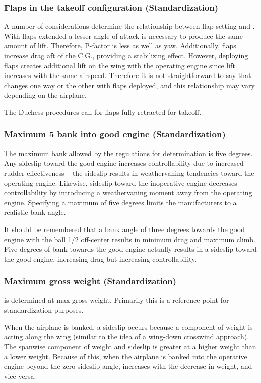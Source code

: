 \subsubsection{Flaps in the takeoff configuration (Standardization)}

A number of considerations determine the relationship between flap setting and \vmc. With flaps extended a lesser
angle of attack is necessary to produce the same amount of lift. Therefore, P-factor is less as well as yaw.
Additionally, flaps increase drag aft of the C.G., providing a stabilizing effect. However, deploying flaps creates
additional lift on the wing with the operating engine since lift increases with the same airspeed. Therefore it is not
straightforward to say that \vmc changes one way or the other with flaps deployed, and this relationship may vary
depending on the airplane.

The Duchess procedures call for flaps fully retracted for takeoff.

\subsubsection{Maximum 5\degree{} bank into good engine (Standardization)}

The maximum bank allowed by the regulations for \vmc determination is five degrees. Any sideslip toward the good
engine increases controllability due to increased rudder effectiveness – the sideslip results in weathervaning
tendencies toward the operating engine. Likewise, sideslip toward the inoperative engine decreases controllability
by introducing a weathervaning moment away from the operating engine. Specifying a maximum of five degrees
limits the manufacturers to a realistic bank angle.

It should be remembered that a bank angle of three degrees towards the good engine with the ball 1/2 off-center
results in minimum drag and maximum climb. Five degrees of bank towards the good engine actually results in a
sideslip toward the good engine, increasing drag but increasing controllability.

\subsubsection{Maximum gross weight (Standardization)}

\vmc is determined at max gross weight. Primarily this is a reference point for standardization purposes.

When the airplane is banked, a sideslip occurs because a component of weight is acting along the wing (similar to
the idea of a wing-down crosswind approach). The spanwise component of weight and sideslip is greater at a higher
weight than a lower weight. Because of this, when the airplane is banked into the operative engine beyond the
zero-sideslip angle, \vmc increases with the decrease in weight, and vice versa.


